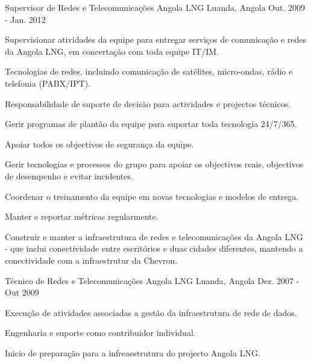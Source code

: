 \begin{cventries}
\cventry
{Supervisor de Redes e Telecomunicações} %
{Angola LNG} %
{Luanda, Angola} %
{Out. 2009 - Jan. 2012} %
{ %
\begin{cvitems}
\item {Supervisionar atividades da equipe para entregar serviços de comunicação e redes da Angola LNG, em concertação com toda equipe IT/IM.}
\item {Tecnologias de redes, incluindo comunicação de satélites, micro-ondas, rádio e telefonia (PABX/IPT).}
\item {Responsabilidade de suporte de decisão para actividades e projectos técnicos.}
\item {Gerir programas de plantão da equipe para suportar toda tecnologia 24/7/365.}
\item {Apoiar todos os objectivos de segurança da equipe.}
\item {Gerir tecnologias e processos do grupo para apoiar os objectivos reais, objectivos de desempenho e evitar incidentes.}
\item {Coordenar o treinamento da equipe em novas tecnologias e modelos de entrega.}
\item {Manter e reportar métricas regularmente.}
\item {Construir e manter a infraestrutura de redes e telecomunicações da Angola LNG - que inclui conectividade entre escritórios e duas cidades diferentes, mantendo a conectividade com a infraestrutur da Chevron.}
\end{cvitems} 
}


\cventry
{Técnico de Redes e Telecomunicações} %
{Angola LNG} %
{Luanda, Angola} %
{Dez. 2007 - Out 2009} %
{ %
\begin{cvitems}
\item {Execução de atividades associadas a gestão da infraestrutura de rede de dados.}
\item {Engenharia e suporte como contribuidor individual.}
\item {Inicio de preparação para a infreaestrutura do projecto Angola LNG.}
\end{cvitems}
}



\end{cventries}
